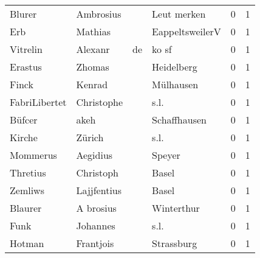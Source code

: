 \begin{center}
\begin{tiny}
\begin{longtabu}{llllrr}
                   Blurer &                          Ambrosius &             &                                 Leut merken &          0 &         1 \\
                      Erb &                            Mathias &             &                             EappeltsweilerV &          0 &         1 \\
                 Vitrelin &                            Alexanr &          de &                                       ko sf &          0 &         1 \\
                  Erastus &                             Zhomas &             &                                  Heidelberg &          0 &         1 \\
                    Finck &                             Kenrad &             &                                   Mülhausen &          0 &         1 \\
            FabriLibertet &                         Christophe &             &                                        s.l. &          0 &         1 \\
                   Büfcer &                               akeh &             &                                Schaffhausen &          0 &         1 \\
                   Kirche &                             Zürich &             &                                        s.l. &          0 &         1 \\
                 Mommerus &                           Aegidius &             &                                      Speyer &          0 &         1 \\
                 Thretius &                          Christoph &             &                                       Basel &          0 &         1 \\
                  Zemliws &                        Lajjfentius &             &                                       Basel &          0 &         1 \\
                  Blaurer &                          A brosius &             &                                  Winterthur &          0 &         1 \\
                     Funk &                           Johannes &             &                                        s.l. &          0 &         1 \\
                   Hotman &                          Frantjois &             &                                  Strassburg &          0 &         1 \\

\end{longtabu}
\end{tiny}
\end{center}
